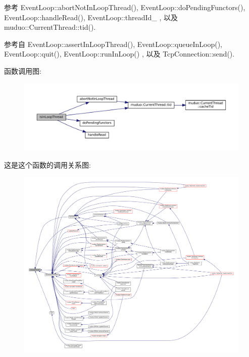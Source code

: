 参考 Event\+Loop\+::abort\+Not\+In\+Loop\+Thread(), Event\+Loop\+::do\+Pending\+Functors(), Event\+Loop\+::handle\+Read(), Event\+Loop\+::thread\+Id\+\_\+ , 以及 muduo\+::\+Current\+Thread\+::tid().



参考自 Event\+Loop\+::assert\+In\+Loop\+Thread(), Event\+Loop\+::queue\+In\+Loop(), Event\+Loop\+::quit(), Event\+Loop\+::run\+In\+Loop() , 以及 Tcp\+Connection\+::send().

函数调用图\+:
\nopagebreak
\begin{figure}[H]
\begin{center}
\leavevmode
\includegraphics[width=350pt]{classmuduo_1_1EventLoop_a1da5ae1e094c0136136b5344ef7a3b66_cgraph}
\end{center}
\end{figure}
这是这个函数的调用关系图\+:
\nopagebreak
\begin{figure}[H]
\begin{center}
\leavevmode
\includegraphics[width=350pt]{classmuduo_1_1EventLoop_a1da5ae1e094c0136136b5344ef7a3b66_icgraph}
\end{center}
\end{figure}
\mbox{\label{classmuduo_1_1EventLoop_afe461d27b9c48d5921c00d521181f12f}} 
